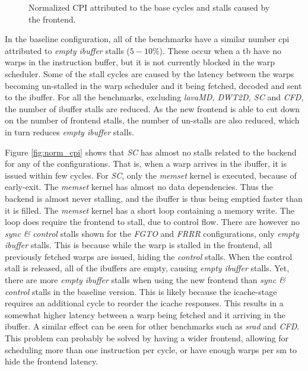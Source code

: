 \begin{figure}
    \centering
    \caption[Normalized \acrshort{cpi} attributed to the frontend]{Normalized CPI attributed to the base cycles and stalls caused by the frontend.}
    \label{fig:norm_cpi_frontend}
\end{figure}

In the baseline configuration, all of the benchmarks have a similar number \acrshort{cpi} attributed to \textit{empty ibuffer} stalls ($5-10\%$). These occur when a \acrshort{tb} have no warps in the instruction buffer, but it is not currently blocked in the warp scheduler. Some of the stall cycles are caused by the latency between the warps becoming un-stalled in the warp scheduler and it being fetched, decoded and sent to the ibuffer. For all the benchmarks, excluding \textit{lavaMD, DWT2D, SC} and \textit{CFD}, the number of ibuffer stalls are reduced. As the new frontend is able to cut down on the number of frontend stalls, the number of un-stalls are also reduced, which in turn reduces \textit{empty ibuffer} stalls.

Figure \ref{fig:norm_cpi} shows that \textit{SC} has almost no stalls related to the backend for any of the configurations. That is, when a warp arrives in the ibuffer, it is issued within few cycles. For \textit{SC}, only the \textit{memset} kernel is executed, because of early-exit. The \textit{memset} kernel has almost no data dependencies. Thus the backend is almost never stalling, and the ibuffer is thus being emptied faster than it is filled. The \textit{memset} kernel has a short loop containing a memory write. The loop does require the frontend to stall, due to control flow. There are however no \textit{sync \& control} stalls shown for the \textit{FGTO} and \textit{FRRR} configurations, only \textit{empty ibuffer} stalls. This is because while the warp is stalled in the frontend, all previously fetched warps are issued, hiding the \textit{control} stalls. When the control stall is released, all of the ibuffers are empty, causing \textit{empty ibuffer} stalls. Yet, there are more \textit{empty ibuffer} stalls when using the new frontend than \textit{sync \& control} stalls in the baseline version. This is likely because the icache-stage requires an additional cycle to reorder the icache responses. This results in a somewhat higher latency between a warp being fetched and it arriving in the ibuffer. A similar effect can be seen for other benchmarks such as \textit{srad} and \textit{CFD}. This problem can probably be solved by having a wider frontend, allowing for scheduling more than one instruction per cycle, or have enough warps per \acrshort{sm} to hide the frontend latency.

